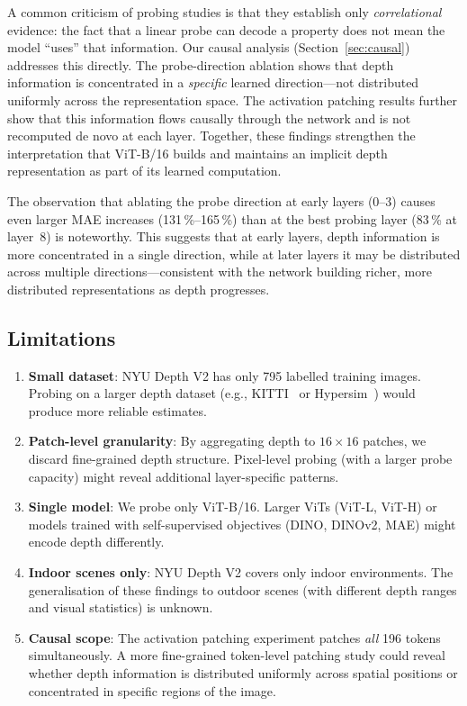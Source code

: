 \documentclass[11pt,a4paper]{article}
\begin{document}
A common criticism of probing studies is that they establish only
\emph{correlational} evidence: the fact that a linear probe can decode a
property does not mean the model ``uses'' that information.  Our causal
analysis (Section~\ref{sec:causal}) addresses this directly.  The
probe-direction ablation shows that depth information is concentrated in a
\emph{specific} learned direction---not distributed uniformly across the
representation space.  The activation patching results further show that this
information flows causally through the network and is not recomputed de novo
at each layer.  Together, these findings strengthen the interpretation that
ViT-B/16 builds and maintains an implicit depth representation as part of its
learned computation.

The observation that ablating the probe direction at early layers (0--3)
causes even larger MAE increases (131\,\%--165\,\%) than at the best probing
layer (83\,\% at layer~8) is noteworthy.  This suggests that at early layers,
depth information is more concentrated in a single direction, while at later
layers it may be distributed across multiple directions---consistent with the
network building richer, more distributed representations as depth progresses.

\subsection{Limitations}

\begin{enumerate}[noitemsep]
    \item \textbf{Small dataset}: NYU Depth V2 has only 795 labelled training
          images.  Probing on a larger depth dataset (e.g., KITTI~\cite{geiger2013kitti}
          or Hypersim~\cite{roberts2021hypersim}) would produce more reliable
          estimates.
    \item \textbf{Patch-level granularity}: By aggregating depth to
          $16\!\times\!16$ patches, we discard fine-grained depth structure.
          Pixel-level probing (with a larger probe capacity) might reveal
          additional layer-specific patterns.
    \item \textbf{Single model}: We probe only ViT-B/16.  Larger ViTs
          (ViT-L, ViT-H) or models trained with self-supervised objectives
          (DINO, DINOv2, MAE) might encode depth differently.
    \item \textbf{Indoor scenes only}: NYU Depth V2 covers only indoor
          environments.  The generalisation of these findings to outdoor
          scenes (with different depth ranges and visual statistics) is
          unknown.
    \item \textbf{Causal scope}: The activation patching experiment patches
          \emph{all} 196 tokens simultaneously.  A more fine-grained
          token-level patching study could reveal whether depth information
          is distributed uniformly across spatial positions or concentrated
          in specific regions of the image.
\end{enumerate}
\end{document}
